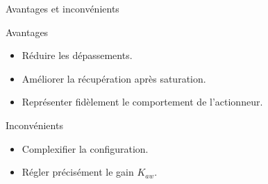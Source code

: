 \begin{frame}{Avantages et inconvénients}

    {
    
    \begin{block}{Avantages}
    
    \begin{itemize}
        \item Réduire les dépassements.
        \item Améliorer la récupération après saturation.
        \item Représenter fidèlement le comportement de l'actionneur.
    \end{itemize}
    \end{block}
    }
    
    
    \begin{block}{Inconvénients}
    \begin{itemize}
        \item Complexifier la configuration.
        \item Régler précisément le gain $K_{aw}$.
    \end{itemize}
    \end{block}
\end{frame}

